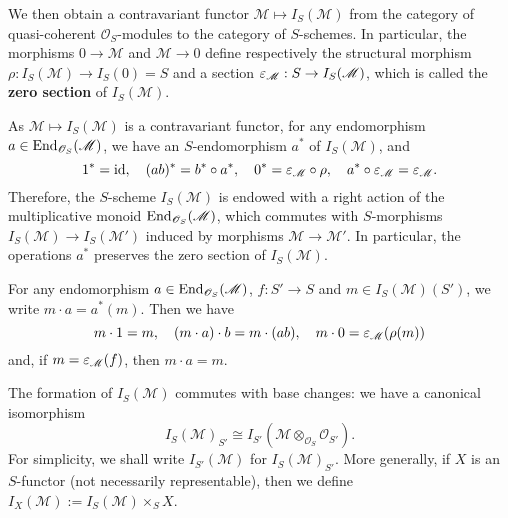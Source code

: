 We then obtain a contravariant functor $\mathscr{M}\mapsto I_S(\mathscr{M})$ from the category of quasi-coherent $\mathscr{O}_S$-modules to the category of $S$-schemes. In particular, the morphisms $0\to\mathscr{M}$ and $\mathscr{M}\to 0$ define respectively the structural morphism $\rho:I_S(\mathscr{M})\to I_S(0)=S$ and a section $\varepsilon_\mathscr{M}:S\to I_S(\mathscr{M})$, which is called the \textbf{zero section} of $I_S(\mathscr{M})$.\par

As $\mathscr{M}\mapsto I_S(\mathscr{M})$ is a contravariant functor, for any endomorphism $a\in\mathrm{End}_{\mathscr{O}_S}(\mathscr{M})$, we have an $S$-endomorphism $a^*$ of $I_S(\mathscr{M})$, and
\[1^*=\operatorname{id},\quad (ab)^*=b^*\circ a^*,\quad 0^*=\varepsilon_\mathscr{M}\circ\rho,\quad a^*\circ\varepsilon_\mathscr{M}=\varepsilon_\mathscr{M}.\]
Therefore, the $S$-scheme $I_S(\mathscr{M})$ is endowed with a right action of the multiplicative monoid $\mathrm{End}_{\mathscr{O}_S}(\mathscr{M})$, which commutes with $S$-morphisms $I_S(\mathscr{M})\to I_S(\mathscr{M}')$ induced by morphisms $\mathscr{M}\to\mathscr{M}'$. In particular, the operations $a^*$ preserves the zero section of $I_S(\mathscr{M})$.\par
For any endomorphism $a\in\mathrm{End}_{\mathscr{O}_S}(\mathscr{M})$, $f:S'\to S$ and $m\in I_S(\mathscr{M})(S')$, we write $m\cdot a=a^*(m)$. Then we have
\[m\cdot 1=m,\quad (m\cdot a)\cdot b=m\cdot(ab),\quad m\cdot 0=\varepsilon_\mathscr{M}(\rho(m))\]
and, if $m=\varepsilon_\mathscr{M}(f)$, then $m\cdot a=m$.

\begin{remark}
The formation of $I_S(\mathscr{M})$ commutes with base changes: we have a canonical isomorphism
\[I_S(\mathscr{M})_{S'}\cong I_{S'}(\mathscr{M}\otimes_{\mathscr{O}_S}\mathscr{O}_{S'}).\]
For simplicity, we shall write $I_{S'}(\mathscr{M})$ for $I_S(\mathscr{M})_{S'}$. More generally, if $X$ is an $S$-functor (not necessarily representable), then we define $I_X(\mathscr{M}):=I_S(\mathscr{M})\times_SX$.
\end{remark}

